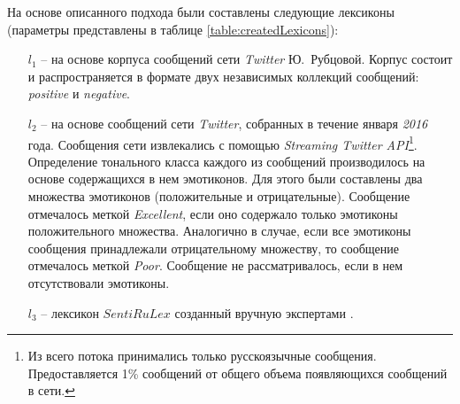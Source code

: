 На основе описанного подхода были составлены следующие лексиконы
(параметры представлены в таблице \ref{table:createdLexicons}):
\begin{itemize}
    \item[$l_1$] -- на основе корпуса сообщений сети {\it Twitter} Ю.~Рубцовой.
        Корпус состоит и распространяется в формате двух независимых коллекций
        сообщений: {\it positive} и {\it negative}.
    \item[$l_2$] -- на основе сообщений сети {\it Twitter}, собранных в течение января {\it 2016} года.
        Сообщения сети извлекались с помощью {\it Streaming Twitter API}\footnote{
            Из всего потока принимались только русскоязычные сообщения.
            Предоставляется 1\% сообщений от общего объема появляющихся сообщений
            в сети.
        }.
        Определение тонального класса каждого из сообщений производилось на
        основе содержащихся в нем эмотиконов.
        Для этого были составлены два множества эмотиконов (положительные и отрицательные).
        Сообщение отмечалось меткой {\it Excellent}, если оно содержало
        только эмотиконы положительного множества.
        Аналогично в случае, если все эмотиконы сообщения принадлежали
        отрицательному множеству, то сообщение отмечалось меткой {\it Poor}.
        Сообщение не рассматривалось, если в нем отсутствовали эмотиконы.

    \item[$l_3$] -- лексикон $SentiRuLex$ созданный вручную экспертами
        \cite{expertLexicon}.
\end{itemize}


